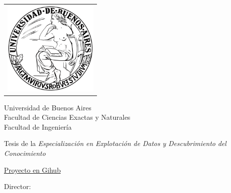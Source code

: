 \newcommand{\HRule}{\rule{\linewidth}{0.2mm}}
%
\thispagestyle{empty}

\begin{center}\leavevmode

\vspace{-2cm}

\begin{tabular}{l}
\includegraphics[width=4.6cm]{./images/logouba.png}
\end{tabular}


{\large \sc Universidad de Buenos Aires\\Facultad de Ciencias Exactas y Naturales \\ Facultad de Ingeniería}

\vspace{5.0cm}

\begin{huge}
\textbf{\tituloTesis}
\end{huge}

\vspace{2cm}

{\large Tesis de la \textit{Especialización en Explotación de Datos y Descubrimiento del Conocimiento}}
\vspace{2cm}

{\large \href{https://github.com/adrianmarino/thesis-paper}{Proyecto en Gihub}}

\vspace{2cm}

{\Large \autor}

\end{center}

\vfill

{\large

{Director: \director}

\vspace{.2cm}

\lugar
}

\newpage\thispagestyle{empty}
